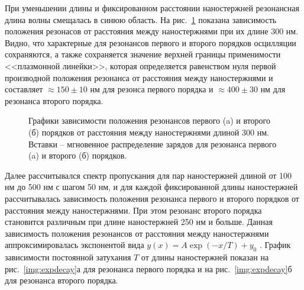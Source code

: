 При уменьшении длины и фиксированном расстоянии наностержней резонансная длина волны смещалась в синюю область. На рис.~\ref{img:a300PML} показана зависимость положения резонасов от расстояния между наностержнями при их длине 300 нм. Видно, что характерные для резонансов первого и второго порядков осцилляции сохраняются, а также сохраняется значение верхней границы применимости <<плазмонной линейки>>, которая определяется равенством нуля первой производной положения резонанса от расстояния между наностержнями и составляет  $ \approx 150 \pm 10 $ нм для резонса первого порядка и $ \approx 400 \pm 30 $ нм для резонанса второго порядка.

\begin{figure}
\caption{Графики зависимости положения  резонансов первого (a) и второго (б) порядков от расстояния между наностержнями длиной 300 нм. Вставки -- мгновенное распределение зарядов для резонанса первого (a) и второго (б) порядков.}
\label{img:a300PML}
\end{figure}

Далее рассчитывался спектр пропускания для пар наностержней длиной от 100 нм до 500 нм с шагом 50 нм, и для каждой фиксированной длины наностержней рассчитывалась зависимость положения резонанса первого и второго порядков от расстояния между наностержнями. При этом резонанс второго порядка становится различным при длине наностержней 250 нм и больше. Данная зависимость положения резонансов от расстояния между наностержнями аппроксимировалась экспонентой вида $ y(x) = A \exp (-x/ T ) + y_0 $ . График зависимости постоянной затухания $ T $ от длины наностержней показан на рис.~\ref{img:expdecay}а для резонанса первого порядка и на рис.~\ref{img:expdecay}б для резонанса второго порядка.

